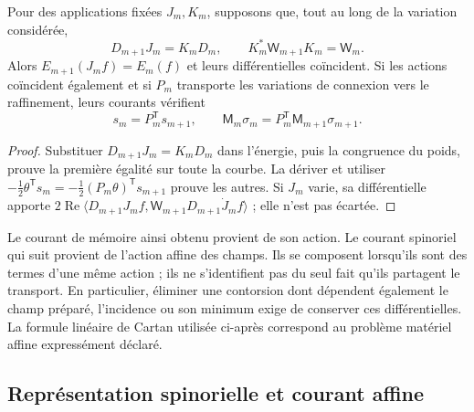 \begin{proposition}
\label{hmtcuatro:ant:refinamiento-corriente} Pour des applications fixées \(J_m,K_m\), supposons que, tout au long de la variation considérée,
\[
 D_{m+1}J_m=K_mD_m,\qquad
 K_m^*\mathsf W_{m+1}K_m=\mathsf W_m .
\]
Alors \(E_{m+1}(J_mf)=E_m(f)\) et leurs différentielles coïncident. Si les actions coïncident également et si \(P_m\) transporte les variations de connexion vers le raffinement, leurs courants vérifient
\[
 s_m=P_m^{\mathsf T}s_{m+1},\qquad
 \mathsf M_m\sigma_m=P_m^{\mathsf T}\mathsf M_{m+1}\sigma_{m+1}.
\]
\end{proposition}
\begin{proof}
Substituer \(D_{m+1}J_m=K_mD_m\) dans l’énergie, puis la congruence du poids, prouve la première égalité sur toute la courbe. La dériver et utiliser \(-\frac12\theta^{\mathsf T}s_m
=-\frac12(P_m\theta)^{\mathsf T}s_{m+1}\) prouve les autres. Si \(J_m\) varie, sa différentielle apporte \(2\operatorname{Re}\langle D_{m+1}J_mf,
\mathsf W_{m+1}D_{m+1}\dot J_m f\rangle\) ; elle n’est pas écartée.
\end{proof}

Le courant de mémoire ainsi obtenu provient de son action. Le courant spinoriel qui suit provient de l’action affine des champs. Ils se composent lorsqu’ils sont des termes d’une même action ; ils ne s’identifient pas du seul fait qu’ils partagent le transport. En particulier, éliminer une contorsion dont dépendent également le champ préparé, l’incidence ou son minimum exige de conserver ces différentielles. La formule linéaire de Cartan utilisée ci-après correspond au problème matériel affine expressément déclaré.

\subsection{Représentation spinorielle et courant affine}
\label{hmtcuatro:ant:espinores}

